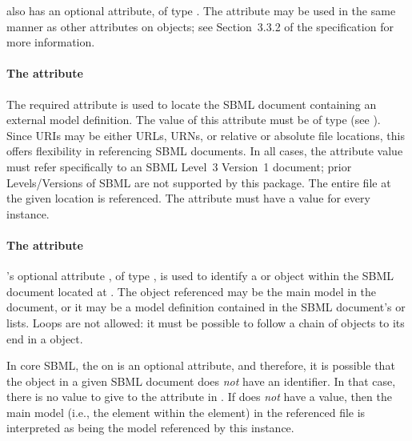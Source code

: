 \ExternalModelDefinition also has an optional  attribute, of
type .  The  attribute may be used
in the same manner as other  attributes on \sbmlthreecore
objects; see Section~3.3.2 of the \sbmlthreecore
specification for more information.


\paragraph{The \fixttspace{} attribute}

The required attribute  is used to locate the SBML
document containing an external model definition.  The value of this
attribute must be of type  (see ).
Since URIs may be either URLs, URNs, or relative or absolute file
locations, this offers flexibility in referencing SBML documents.  In
all cases, the  attribute value must refer specifically to
an SBML Level~3 Version~1 document; prior Levels/Versions of SBML are
not supported by this package.  The entire file at the given location is
referenced.  The  attribute must have a value for every
\ExternalModelDefinition instance.

\paragraph{The \fixttspace{} attribute}

\ExternalModelDefinition's optional attribute , of type
, is used to identify a \Model or
\ExternalModelDefinition object within the SBML document located at
.  The object referenced may be the main model in the
document, or it may be a model definition contained in the SBML
document's  or
 lists.  Loops are not allowed: it
must be possible to follow a chain of \ExternalModelDefinition objects
to its end in a \Model object.

In core SBML, the  on \Model is an optional attribute, and
therefore, it is possible that the \Model object in a given SBML
document does \emph{not} have an identifier.  In that case, there is no
value to give to the  attribute in
\ExternalModelDefinition.  If  does \emph{not} have a
value, then the main model (i.e., the  element within the
 element) in the referenced file is interpreted as being
the model referenced by this \ExternalModelDefinition instance.


